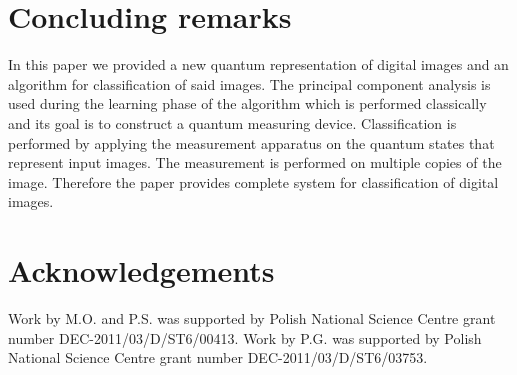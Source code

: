 \documentclass[a4paper,10pt]{llncs}
\newcommand{\1}{\mathbb{1}}
\begin{document}
\section{Concluding remarks}
In this paper we provided a new quantum representation of digital images and an 
algorithm for classification of said images. The principal component analysis 
is used during the learning phase of the algorithm which is performed 
classically and its goal is to construct a quantum measuring device.
Classification is performed by applying the measurement apparatus on the 
quantum states that represent input images. The measurement is performed on 
multiple copies of the image. Therefore the paper provides complete system for 
classification of digital images.

\section{Acknowledgements}
Work by M.O. and P.S. was supported by Polish National Science Centre grant 
number DEC-2011/03/D/ST6/00413.
Work by P.G. was supported by Polish National Science Centre grant number
DEC-2011/03/D/ST6/03753.
 


\end{document}
